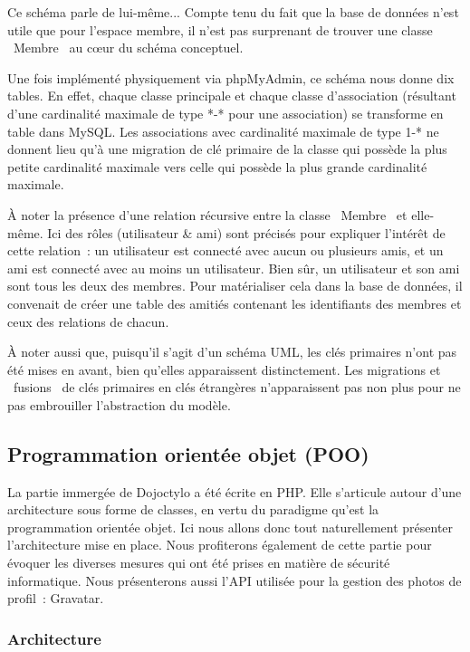 \documentclass[a4paper,12pt]{article}
\begin{document}
Ce schéma parle de lui-même... Compte tenu du fait que la base de données n'est utile que pour l'espace membre, il n'est pas surprenant de trouver une classe \og~Membre~\fg{} au cœur du schéma conceptuel.

Une fois implémenté physiquement via phpMyAdmin, ce schéma nous donne dix tables. En effet, chaque classe principale et chaque classe d'association (résultant d'une cardinalité maximale de type *-* pour une association) se transforme en table dans MySQL. Les associations avec cardinalité maximale de type 1-* ne donnent lieu qu'à une migration de clé primaire de la classe qui possède la plus petite cardinalité maximale vers celle qui possède la plus grande cardinalité maximale.

À noter la présence d'une relation récursive entre la classe \og~Membre~\fg{} et elle-même. Ici des rôles (utilisateur \& ami) sont précisés pour expliquer l'intérêt de cette relation~: un utilisateur est connecté avec aucun ou plusieurs amis, et un ami est connecté avec au moins un utilisateur. Bien sûr, un utilisateur et son ami sont tous les deux des membres. Pour matérialiser cela dans la base de données, il convenait de créer une table des amitiés contenant les identifiants des membres et ceux des relations de chacun.

À noter aussi que, puisqu'il s'agit d'un schéma UML, les clés primaires n'ont pas été mises en avant, bien qu'elles apparaissent distinctement. Les migrations et \og~fusions~\fg{} de clés primaires en clés étrangères n'apparaissent pas non plus pour ne pas embrouiller l'abstraction du modèle.

\subsection{Programmation orientée objet (POO)}

La partie immergée de Dojoctylo a été écrite en PHP. Elle s'articule autour d'une architecture sous forme de classes, en vertu du paradigme qu'est la programmation orientée objet. Ici nous allons donc tout naturellement présenter l'architecture mise en place. Nous profiterons également de cette partie pour évoquer les diverses mesures qui ont été prises en matière de sécurité informatique. Nous présenterons aussi l'API utilisée pour la gestion des photos de profil~: Gravatar.

\subsubsection{Architecture}
\end{document}
